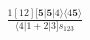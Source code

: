 \documentclass[varwidth, border=5pt]{standalone}
\begin{document}
\begin{my}
$\begin{gathered}
\scriptscriptstyle\frac{1[12][𝟓|𝟓|4⟩⟨4𝟓⟩}{⟨4|1+2|3]s_{123}}
\end{gathered}$
\end{my}
\end{document}

